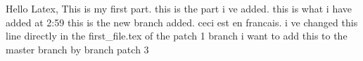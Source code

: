\documentclass[a4paper]{article}
\begin{document}
Hello Latex, This is my first part.\newline
this is the part i ve added.\newline
this is what i have added at 2:59\newline
this is the new branch added.
ceci est en francais.
i ve changed this line directly in the first_file.tex of the patch 1 branch
i want to add this to the master branch by branch patch 3

\end{document}

